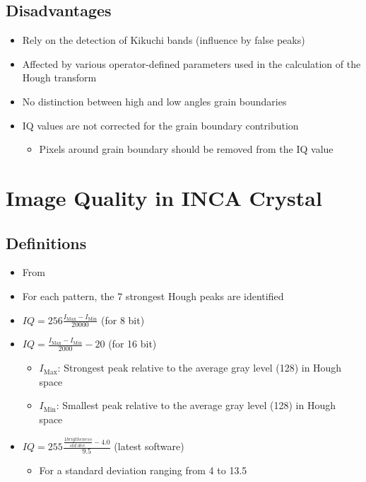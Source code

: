 \documentclass[letterpaper]{article}
\begin{document}
		\subsection{Disadvantages}
			\begin{itemize}
				\item Rely on the detection of Kikuchi bands (influence by false peaks) \cite{Tao2005}
				\item Affected by various operator-defined parameters used in the calculation of the Hough transform \cite{Wright2006}
				\item No distinction between high and low angles grain boundaries \cite{Wright2006}
				\item IQ values are not corrected for the grain boundary contribution \cite{Wu2005}
					\begin{itemize}
						\item Pixels around grain boundary should be removed from the IQ value
					\end{itemize}
			\end{itemize}

\newpage
	\section{Image Quality in INCA Crystal}
		\subsection{Definitions}
			\begin{itemize}
				\item From \cite{Sitzman2009}
				\item For each pattern, the 7 strongest Hough peaks are identified
				\item $IQ = 256 \frac{I_{\text{Max}} - I_{\text{Min}}}{20000}$ (for 8 bit)
				\item $IQ = \frac{I_{\text{Max}} - I_{\text{Min}}}{2000}-20$ (for 16 bit)
					\begin{itemize}
						\item $I_{\text{Max}}$: Strongest peak relative to the average gray level (128) in Hough space
						\item $I_{\text{Min}}$: Smallest peak relative to the average gray level (128) in Hough space
					\end{itemize}
				\item $IQ = 255 \frac{\frac{1brigtheness}{std.dev.} - 4.0}{9.5}$ (latest software)
					\begin{itemize}
						\item For a standard deviation ranging from 4 to 13.5
					\end{itemize}
			\end{itemize}
\end{document}
